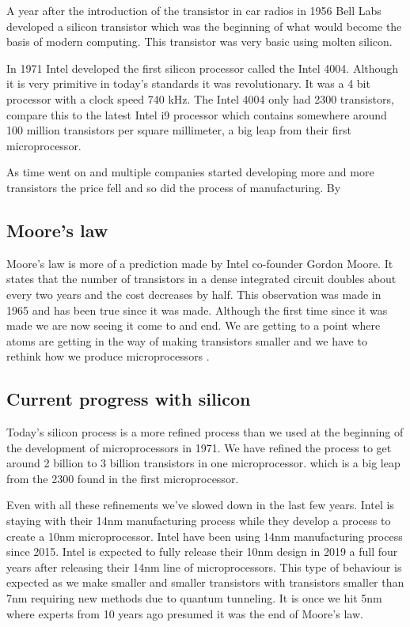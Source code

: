 \documentclass[journal]{IEEEtran}
\begin{document}
A year after the introduction of the transistor in car radios in 1956 Bell Labs \cite{8896076320180101} developed a silicon transistor which was the beginning of what would become the basis of modern computing. This transistor was very basic using molten silicon.

In 1971 Intel developed the first silicon processor called the Intel 4004. Although it is very primitive in today's standards it was revolutionary. It was a 4 bit processor with a clock speed 740 kHz. The Intel 4004 only had 2300 transistors, compare this to the latest Intel i9 processor which contains somewhere around 100 million transistors per square millimeter, a big leap from their first microprocessor. 

As time went on and multiple companies started developing more and more transistors the price fell and so did the process of manufacturing. By 

\subsection{Moore's law}
Moore's law \cite{12560013020170101} is more of a prediction made by Intel co-founder Gordon Moore. It states that the number of transistors in a dense integrated circuit doubles about every two years and the cost decreases by half. This observation was made in 1965 and has been true since it was made. Although the first time since it was made we are now seeing it come to and end. We are getting to a point where atoms are getting in the way of making transistors smaller and we have to rethink how we produce microprocessors \cite{591665}.

\subsection{Current progress with silicon}
Today's silicon process is a more refined process than we used at the beginning of the development of microprocessors in 1971. We have refined the process to get around 2 billion to 3 billion transistors in one microprocessor. which is a big leap from the 2300 found in the first microprocessor.

Even with all these refinements we've slowed down in the last few years. Intel is staying with their 14nm manufacturing process while they develop a process to create a 10nm microprocessor. Intel have been using 14nm manufacturing process since 2015. Intel is expected to fully release their 10nm design in 2019 a full four years after releasing their 14nm line of microprocessors. This type of behaviour is expected as we make smaller and smaller transistors with transistors smaller than 7nm requiring new methods due to quantum tunneling. It is once we hit 5nm where experts from 10 years ago presumed it was the end of Moore's law. \cite{591665}

\printbibliography
\end{document}
